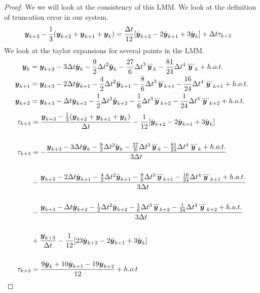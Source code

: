 \documentclass{article}
\begin{document}
\begin{enumerate}[label=\alph*)]
\begin{proof}
        We we will look at the consistency of this LMM. We look at the
        definition of truncation error in our system. 
        \begin{align*}
            \boldsymbol{y}_{k+3} - \frac{1}{3}(\boldsymbol{y}_{k+2} + \boldsymbol{y}_{k+1} + \boldsymbol{y}_{k}) &=
            \frac{\Delta t}{12}[\dot{\boldsymbol{y}}_{k+2} - 2\dot{\boldsymbol{y}}_{k+1} + 3\dot{\boldsymbol{y}}_{k}] + \Delta t
            \tau_{k+3}
        \end{align*}
        We look at the taylor expansions for several points in the LMM. 
        \begin{align*}
            \boldsymbol{y}_{k} &= \boldsymbol{y}_{k+3} - 3\Delta t \dot{\boldsymbol{y}}_{k} - \frac{9}{2}\Delta t^2\ddot{\boldsymbol{y}}_{k} -
            \frac{27}{6}\Delta t^3\dddot{\boldsymbol{y}}_{k} - \frac{81}{24}\Delta t^4\ddddot{\boldsymbol{y}}_{k} +
            h.o.t.\\
            \boldsymbol{y}_{k+1} &= \boldsymbol{y}_{k+3} - 2\Delta t \dot{\boldsymbol{y}}_{k+1} - \frac{4}{2}\Delta t^2\ddot{\boldsymbol{y}}_{k+1} -
            \frac{8}{6}\Delta t^3\dddot{\boldsymbol{y}}_{k+1} - \frac{16}{24}\Delta t^4\ddddot{\boldsymbol{y}}_{k+1} +
            h.o.t.\\
            \boldsymbol{y}_{k+2} &= \boldsymbol{y}_{k+3} - \Delta t \dot{\boldsymbol{y}}_{k+2} - \frac{1}{2}\Delta t^2\ddot{\boldsymbol{y}}_{k+2} -
            \frac{1}{6}\Delta t^3\dddot{\boldsymbol{y}}_{k+2} - \frac{1}{24}\Delta t^4\ddddot{\boldsymbol{y}}_{k+2}+
            h.o.t.
        \end{align*}
        \begin{align*}
            \tau_{k+3} &= \frac{\boldsymbol{y}_{k+3} - \frac{1}{3}(\boldsymbol{y}_{k+2} +
            \boldsymbol{y}_{k+1} + \boldsymbol{y}_{k})}{\Delta t} - \frac{1}{12}[\dot{\boldsymbol{y}}_{k+2} 
            - 2\dot{\boldsymbol{y}}_{k+1} + 3\dot{\boldsymbol{y}}_{k}]\\\\
            \tau_{k+3} &= -\frac{\boldsymbol{y}_{k+3} - 3\Delta t \dot{\boldsymbol{y}}_{k} - \frac{9}{2}\Delta t^2\ddot{\boldsymbol{y}}_{k} -
            \frac{27}{6}\Delta t^3\dddot{\boldsymbol{y}}_{k} - \frac{81}{24}\Delta t^4\ddddot{\boldsymbol{y}}_{k} +
            h.o.t.}{3\Delta t}\\\\
            &- \frac{\boldsymbol{y}_{k+3} - 2\Delta t \dot{\boldsymbol{y}}_{k+1} - \frac{4}{2}\Delta t^2\ddot{\boldsymbol{y}}_{k+1} -
            \frac{8}{6}\Delta t^3\dddot{\boldsymbol{y}}_{k+1} - \frac{16}{24}\Delta t^4\ddddot{\boldsymbol{y}}_{k+1} +
            h.o.t.}{3\Delta t}\\\\
            &-\frac{\boldsymbol{y}_{k+3} - \Delta t \dot{\boldsymbol{y}}_{k+2} - \frac{1}{2}\Delta t^2\ddot{\boldsymbol{y}}_{k+2} -
            \frac{1}{6}\Delta t^3\dddot{\boldsymbol{y}}_{k+2} - \frac{1}{24}\Delta t^4\ddddot{\boldsymbol{y}}_{k+2}+
            h.o.t.}{3\Delta t} \\\\
            &+ \frac{\boldsymbol{y}_{k+3}}{\Delta t} - \frac{1}{12}[23\dot{\boldsymbol{y}}_{k+2} -
            2\dot{\boldsymbol{y}}_{k+1} + 3\dot{\boldsymbol{y}}_{k}] \\\\
            \tau_{k+3} &= \frac{9\dot{\boldsymbol{y}}_k + 10\dot{\boldsymbol{y}}_{k+1}
            -19\dot{\boldsymbol{y}}_{k+2}}{12} + h.o.t
        \end{align*}
    \end{proof}


\end{enumerate}
\end{document}

